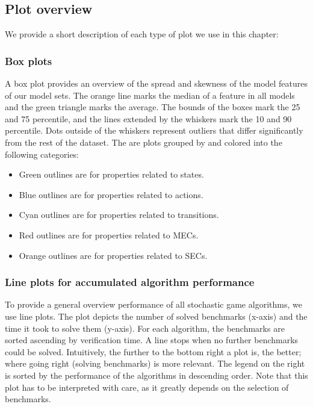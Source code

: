 \subsection{Plot overview} \label{subsec:plots}
We provide a short description of each type of plot we use in this chapter:
\subsubsection*{Box plots} \label{plot:boxplot}
A box plot provides an overview of the spread and skewness of the model features of our model sets.
The orange line marks the median of a feature in all models and the green triangle marks the
average. The bounds of the boxes mark the 25 and 75 percentile, and the lines extended
by the whiskers mark the 10 and 90 percentile. Dots outside of the whiskers represent
outliers that differ significantly from the rest of the dataset.
The are plots grouped by and colored into the following categories:
\begin{itemize}
    \item Green outlines are for properties related to states. 
    \item Blue outlines are for properties related to actions. 
    \item Cyan outlines are for properties related to transitions.
    \item Red outlines are for properties related to MECs.
    \item Orange outlines are for properties related to SECs. 
\end{itemize}

\subsubsection*{Line plots for accumulated algorithm performance} \label{plot:starplot}
To provide a general overview performance of all stochastic game algorithms, we use line plots.
The plot depicts the number of solved benchmarks (x-axis) and the time it took to solve them (y-axis). 
For each algorithm, the benchmarks are sorted ascending by verification time. A line stops when no further benchmarks could be solved.
Intuitively, the further to the bottom right a plot is, the better; where going right (solving benchmarks) is more relevant.
The legend on the right is sorted by the performance of the algorithms in descending order.
Note that this plot has to be interpreted with care, as it greatly depends on the selection of benchmarks.

